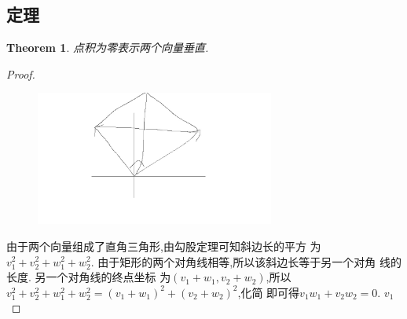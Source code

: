 \documentclass[UTF-8]{ctexart}
\newtheorem{theorem}{Theorem}[section]
\newtheorem{proof}{Proof}[section]
\begin{document}
\subsection{定理}
\begin{theorem}
  点积为零表示两个向量垂直.

\end{theorem}


\begin{proof}
  \begin{figure}[H] %
    \centering %
    \includegraphics[width=0.7\textwidth]{images/math/1.jpg} %
  \end{figure}
  由于两个向量组成了直角三角形,由勾股定理可知斜边长的平方
  为$v_1^2+v_2^2+w_1^2+w_2^2$. 由于矩形的两个对角线相等,所以该斜边长等于另一个对角
  线的长度. 另一个对角线的终点坐标
  为$(v_1+w_1,v_2+w_2)$,所以$v_1^2+v_2^2+w_1^2+w_2^2=(v_1+w_1)^2+(v_2+w_2)^2$,化简
  即可得$v_1w_1+v_2w_2=0$. $v_1$	
\end{proof}
\end{document}
